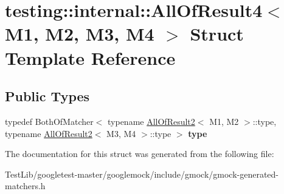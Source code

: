\hypertarget{structtesting_1_1internal_1_1AllOfResult4}{}\section{testing\+:\+:internal\+:\+:All\+Of\+Result4$<$ M1, M2, M3, M4 $>$ Struct Template Reference}
\label{structtesting_1_1internal_1_1AllOfResult4}
\subsection*{Public Types}
\begin{DoxyCompactItemize}
\item 
\mbox{\label{structtesting_1_1internal_1_1AllOfResult4_ab277e20178bac632d4e5a39a1a407bbf}} 
typedef Both\+Of\+Matcher$<$ typename \hyperlink{structtesting_1_1internal_1_1AllOfResult2}{All\+Of\+Result2}$<$ M1, M2 $>$\+::type, typename \hyperlink{structtesting_1_1internal_1_1AllOfResult2}{All\+Of\+Result2}$<$ M3, M4 $>$\+::type $>$ {\bfseries type}
\end{DoxyCompactItemize}


The documentation for this struct was generated from the following file\+:\begin{DoxyCompactItemize}
\item 
Test\+Lib/googletest-\/master/googlemock/include/gmock/gmock-\/generated-\/matchers.\+h\end{DoxyCompactItemize}
